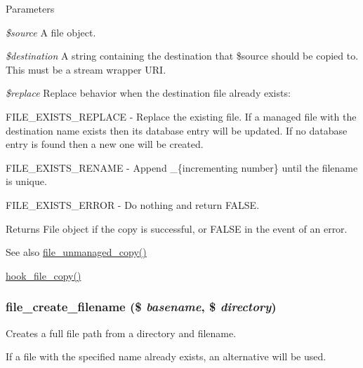 \begin{DoxyParams}{Parameters}
\item[{\em \$source}]A file object. \item[{\em \$destination}]A string containing the destination that \$source should be copied to. This must be a stream wrapper URI. \item[{\em \$replace}]Replace behavior when the destination file already exists:
\begin{DoxyItemize}
\item FILE\_\-EXISTS\_\-REPLACE -\/ Replace the existing file. If a managed file with the destination name exists then its database entry will be updated. If no database entry is found then a new one will be created.
\item FILE\_\-EXISTS\_\-RENAME -\/ Append \_\-\{incrementing number\} until the filename is unique.
\item FILE\_\-EXISTS\_\-ERROR -\/ Do nothing and return FALSE.
\end{DoxyItemize}\end{DoxyParams}
\begin{DoxyReturn}{Returns}
File object if the copy is successful, or FALSE in the event of an error.
\end{DoxyReturn}
\begin{DoxySeeAlso}{See also}
\hyperlink{group__file_ga19b0d88682d26b7e5d03cb22ac2af391}{file\_\-unmanaged\_\-copy()} 

\hyperlink{group__hooks_ga49e2e5f9993e98da69c3434999242711}{hook\_\-file\_\-copy()} 
\end{DoxySeeAlso}
\hypertarget{group__file_ga057bbfa5f89c4e4c75f0030e6f1f3809}{
\subsubsection[{file\_\-create\_\-filename}]{\setlength{\rightskip}{0pt plus 5cm}file\_\-create\_\-filename (\$ {\em basename}, \/  \$ {\em directory})}}
\label{group__file_ga057bbfa5f89c4e4c75f0030e6f1f3809}
Creates a full file path from a directory and filename.

If a file with the specified name already exists, an alternative will be used.


